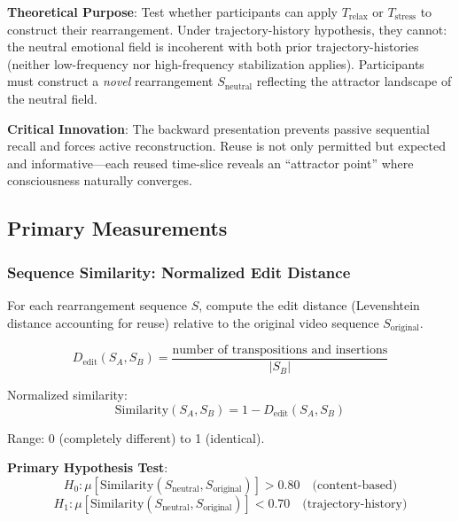 \documentclass[12pt,a4paper]{article}
\theoremstyle{definition}
\begin{document}
\textbf{Theoretical Purpose}: Test whether participants can apply $T_{\text{relax}}$ or $T_{\text{stress}}$ to construct their rearrangement. Under trajectory-history hypothesis, they cannot: the neutral emotional field is incoherent with both prior trajectory-histories (neither low-frequency nor high-frequency stabilization applies). Participants must construct a \textit{novel} rearrangement $S_{\text{neutral}}$ reflecting the attractor landscape of the neutral field.

\textbf{Critical Innovation}: The backward presentation prevents passive sequential recall and forces active reconstruction. Reuse is not only permitted but expected and informative---each reused time-slice reveals an ``attractor point'' where consciousness naturally converges.

\subsection{Primary Measurements}

\subsubsection{Sequence Similarity: Normalized Edit Distance}

For each rearrangement sequence $S$, compute the edit distance (Levenshtein distance accounting for reuse) relative to the original video sequence $S_{\text{original}}$.

\begin{equation}
D_{\text{edit}}(S_A, S_B) = \frac{\text{number of transpositions and insertions}}{|S_B|}
\end{equation}

Normalized similarity:
\begin{equation}
\text{Similarity}(S_A, S_B) = 1 - D_{\text{edit}}(S_A, S_B)
\end{equation}

Range: 0 (completely different) to 1 (identical).

\textbf{Primary Hypothesis Test}:
\begin{equation}
H_0: \mu[\text{Similarity}(S_{\text{neutral}}, S_{\text{original}})] > 0.80 \quad \text{(content-based)}
\end{equation}
\begin{equation}
H_1: \mu[\text{Similarity}(S_{\text{neutral}}, S_{\text{original}})] < 0.70 \quad \text{(trajectory-history)}
\end{equation}
\end{document}
